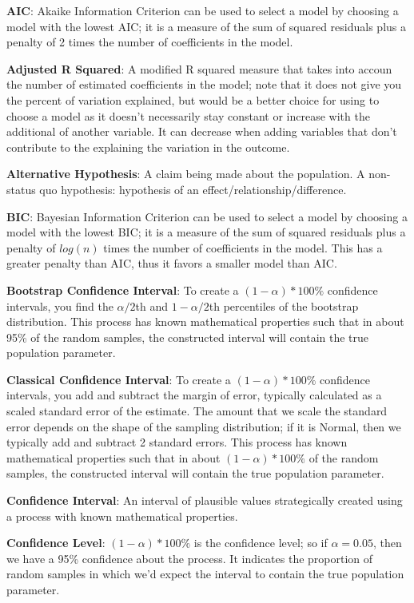 \documentclass[
]{book}
\begin{document}
\textbf{AIC}: Akaike Information Criterion can be used to select a model by choosing a model with the lowest AIC; it is a measure of the sum of squared residuals plus a penalty of 2 times the number of coefficients in the model.

\textbf{Adjusted R Squared}: A modified R squared measure that takes into accoun the number of estimated coefficients in the model; note that it does not give you the percent of variation explained, but would be a better choice for using to choose a model as it doesn't necessarily stay constant or increase with the additional of another variable. It can decrease when adding variables that don't contribute to the explaining the variation in the outcome.

\textbf{Alternative Hypothesis}: A claim being made about the population. A non-status quo hypothesis: hypothesis of an effect/relationship/difference.

\textbf{BIC}: Bayesian Information Criterion can be used to select a model by choosing a model with the lowest BIC; it is a measure of the sum of squared residuals plus a penalty of \(log(n)\) times the number of coefficients in the model. This has a greater penalty than AIC, thus it favors a smaller model than AIC.

\textbf{Bootstrap Confidence Interval}: To create a \((1-\alpha)*100\%\) confidence intervals, you find the \(\alpha/2\)th and \(1-\alpha/2\)th percentiles of the bootstrap distribution. This process has known mathematical properties such that in about 95\% of the random samples, the constructed interval will contain the true population parameter.

\textbf{Classical Confidence Interval}: To create a \((1-\alpha)*100\%\) confidence intervals, you add and subtract the margin of error, typically calculated as a scaled standard error of the estimate. The amount that we scale the standard error depends on the shape of the sampling distribution; if it is Normal, then we typically add and subtract 2 standard errors. This process has known mathematical properties such that in about \((1-\alpha)*100\%\) of the random samples, the constructed interval will contain the true population parameter.

\textbf{Confidence Interval}: An interval of plausible values strategically created using a process with known mathematical properties.

\textbf{Confidence Level}: \((1-\alpha)*100\%\) is the confidence level; so if \(\alpha = 0.05\), then we have a 95\% confidence about the process. It indicates the proportion of random samples in which we'd expect the interval to contain the true population parameter.
\end{document}
